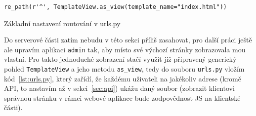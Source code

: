     \begin{listing}[ht]
    	\begin{verbatim}
re_path(r'^', TemplateView.as_view(template_name="index.html"))
    	\end{verbatim}
    	\caption{Základní nastavení routování v urls.py}\label{lst:urls.py}
    \end{listing}
    
    Do serverové části zatím nebudu v této sekci příliš zasahovat, pro další práci ještě ale upravím aplikaci \verb|admin| tak, aby místo své výchozí stránky zobrazovala mou vlastní. Pro takto jednoduché zobrazení stačí využít již připravený generický pohled \verb|TemplateView| a jeho metodu \verb|as_view|, tedy do souboru \verb|urls.py| vložím kód~\ref{lst:urls.py}, který zařídí, že každému uživateli na jakékoliv adrese (kromě API, to nastavím až v sekci~\ref{sec:api}) ukážu daný soubor (zobrazit klientovi správnou stránku v rámci webové aplikace bude zodpovědnost JS na klientské části).
    

